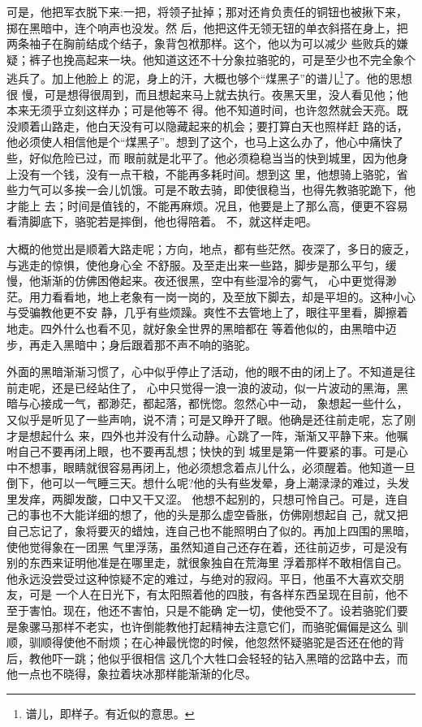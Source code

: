 \documentclass[11pt,a4paper,onecolumn]{article}
\begin{document}
可是，他把军衣脱下来:一把，将领子扯掉；那对还肯负责任的铜钮也被揪下来，掷在黑暗中，连个响声也没发。然
后，他把这件无领无钮的单衣斜搭在身上，把两条袖子在胸前结成个结子，象背包袱那样。这个，他以为可以减少
些败兵的嫌疑；裤子也挽高起来一块。他知道这还不十分象拉骆驼的，可是至少也不完全象个逃兵了。加上他脸上
的泥，身上的汗，大概也够个``煤黑子''的谱儿\footnote{谱儿，即样子。有近似的意思。}了。他的思想很
慢，可是想得很周到，而且想起来马上就去执行。夜黑天里，没人看见他；他本来无须乎立刻这样办；可是他等不
得。他不知道时间，也许忽然就会天亮。既没顺着山路走，他白天没有可以隐藏起来的机会；要打算白天也照样赶
路的话，他必须使人相信他是个``煤黑子''。想到了这个，也马上这么办了，他心中痛快了些，好似危险已过，而
眼前就是北平了。他必须稳稳当当的快到城里，因为他身上没有一个钱，没有一点干粮，不能再多耗时间。想到这
里，他想骑上骆驼，省些力气可以多挨一会儿饥饿。可是不敢去骑，即使很稳当，也得先教骆驼跪下，他才能上
去；时间是值钱的，不能再麻烦。况且，他要是上了那么高，便更不容易看清脚底下，骆驼若是摔倒，他也得陪着。
不，就这样走吧。

大概的他觉出是顺着大路走呢；方向，地点，都有些茫然。夜深了，多日的疲乏，与逃走的惊惧，使他身心全
不舒服。及至走出来一些路，脚步是那么平匀，缓慢，他渐渐的仿佛困倦起来。夜还很黑，空中有些湿冷的雾气，
心中更觉得渺茫。用力看看地，地上老象有一岗一岗的，及至放下脚去，却是平坦的。这种小心与受骗教他更不安
静，几乎有些烦躁。爽性不去管地上了，眼往平里看，脚擦着地走。四外什么也看不见，就好象全世界的黑暗都在
等着他似的，由黑暗中迈步，再走入黑暗中；身后跟着那不声不响的骆驼。

外面的黑暗渐渐习惯了，心中似乎停止了活动，他的眼不由的闭上了。不知道是往前走呢，还是已经站住了，
心中只觉得一浪一浪的波动，似一片波动的黑海，黑暗与心接成一气，都渺茫，都起落，都恍惚。忽然心中一动，
象想起一些什么，又似乎是听见了一些声响，说不清；可是又睁开了眼。他确是还往前走呢，忘了刚才是想起什么
来，四外也并没有什么动静。心跳了一阵，渐渐又平静下来。他嘱咐自己不要再闭上眼，也不要再乱想；快快的到
城里是第一件要紧的事。可是心中不想事，眼睛就很容易再闭上，他必须想念着点儿什么，必须醒着。他知道一旦
倒下，他可以一气睡三天。想什么呢?他的头有些发晕，身上潮渌渌的难过，头发里发痒，两脚发酸，口中又干又涩。
他想不起别的，只想可怜自己。可是，连自己的事也不大能详细的想了，他的头是那么虚空昏胀，仿佛刚想起自
己，就又把自己忘记了，象将要灭的蜡烛，连自己也不能照明白了似的。再加上四围的黑暗，使他觉得象在一团黑
气里浮荡，虽然知道自己还存在着，还往前迈步，可是没有别的东西来证明他准是在哪里走，就很象独自在荒海里
浮着那样不敢相信自己。他永远没尝受过这种惊疑不定的难过，与绝对的寂闷。平日，他虽不大喜欢交朋友，可是
一个人在日光下，有太阳照着他的四肢，有各样东西呈现在目前，他不至于害怕。现在，他还不害怕，只是不能确
定一切，使他受不了。设若骆驼们要是象骡马那样不老实，也许倒能教他打起精神去注意它们，而骆驼偏偏是这么
驯顺，驯顺得使他不耐烦；在心神最恍惚的时候，他忽然怀疑骆驼是否还在他的背后，教他吓一跳；他似乎很相信
这几个大牲口会轻轻的钻入黑暗的岔路中去，而他一点也不晓得，象拉着块冰那样能渐渐的化尽。
\end{document}
